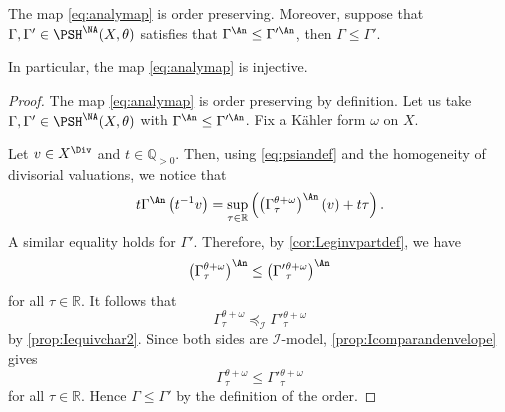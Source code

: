 \begin{lemma}\label{lma:anaorder}
    The map \eqref{eq:analymap} is order preserving. Moreover, suppose that $\Gamma,\Gamma'\in \PSH^{\NA}(X,\theta)$ satisfies that $\Gamma^{\An}\leq \Gamma'^{\An}$, then $\Gamma\leq \Gamma'$.

    In particular, the map \eqref{eq:analymap} is injective.
\end{lemma}
\begin{proof}
    The map \eqref{eq:analymap} is order preserving by definition. Let us take $\Gamma,\Gamma'\in \PSH^{\NA}(X,\theta)$ with $\Gamma^{\An}\leq \Gamma'^{\An}$. Fix a K\"ahler form $\omega$ on $X$.

    Let $v\in X^{\Div}$ and $t \in \mathbb{Q}_{>0}$. Then, using \eqref{eq:psiandef} and the homogeneity of divisorial valuations, we notice that
\begin{equation}\label{eq:legendre_NA}
t \Gamma^\An \left(t^{-1} v \right) =  \sup_{\tau\in \mathbb{R}}\left( \left(\Gamma_{\tau}^{\theta+\omega}\right)^{\An}(v)+ t \tau\right).
\end{equation}
A similar equality holds for $\Gamma'$. Therefore, by \cref{cor:Leginvpartdef}, we have
\[
\left(\Gamma_{\tau}^{\theta+\omega}\right)^{\An}\leq \left(\Gamma'{}_{\tau}^{\theta+\omega}\right)^{\An}
\]
for all $\tau \in \mathbb{R}$. It follows that
\[
\Gamma_{\tau}^{\theta+\omega}\preceq_{\mathcal{I}} \Gamma'{}_{\tau}^{\theta+\omega}
\]
by \cref{prop:Iequivchar2}. Since both sides are $\mathcal{I}$-model, \cref{prop:Icomparandenvelope} gives
\[
\Gamma_{\tau}^{\theta+\omega}\leq \Gamma'{}_{\tau}^{\theta+\omega}
\]
for all $\tau\in \mathbb{R}$. Hence $\Gamma\leq \Gamma'$ by the definition of the order.
\end{proof}

